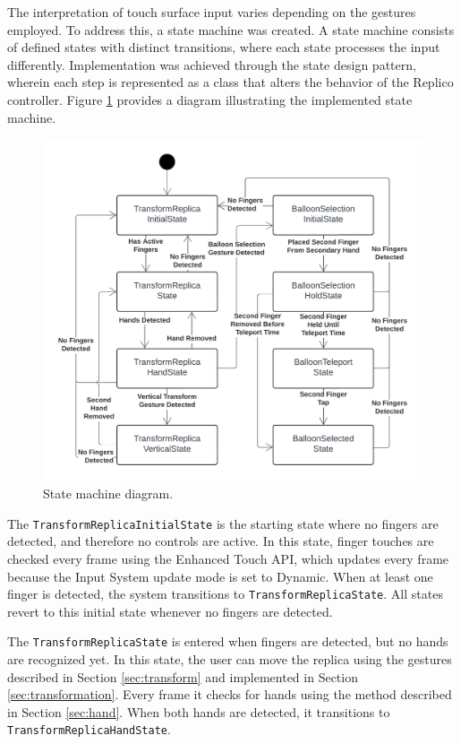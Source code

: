     The interpretation of touch surface input varies depending on the gestures employed. To address this, a state machine was created. A state machine consists of defined states with distinct transitions, where each state processes the input differently. Implementation was achieved through the state design pattern, wherein each step is represented as a class that alters the behavior of the Replico controller. Figure \ref{fig:states} provides a diagram illustrating the implemented state machine.

    \begin{figure}[h]
        \centering
        \includegraphics[width=1\linewidth]{figures/states.png}
        \caption{State machine diagram.}
        \label{fig:states}
    \end{figure}

    The \lstinline{TransformReplicaInitialState} is the starting state where no fingers are detected, and therefore no controls are active. In this state, finger touches are checked every frame using the Enhanced Touch API, which updates every frame because the Input System update mode is set to Dynamic. When at least one finger is detected, the system transitions to \lstinline{TransformReplicaState}. All states revert to this initial state whenever no fingers are detected.
    
    The \lstinline{TransformReplicaState} is entered when fingers are detected, but no hands are recognized yet. In this state, the user can move the replica using the gestures described in Section \ref{sec:transform} and implemented in Section \ref{sec:transformation}. Every frame it checks for hands using the method described in Section \ref{sec:hand}. When both hands are detected, it transitions to \lstinline{TransformReplicaHandState}.
    
